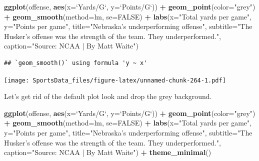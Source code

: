 \documentclass[]{book}
\newenvironment{Shaded}{\begin{snugshade}}{\end{snugshade}}
\newcommand{\DataTypeTok}[1]{\textcolor[rgb]{0.13,0.29,0.53}{#1}}
\newcommand{\KeywordTok}[1]{\textcolor[rgb]{0.13,0.29,0.53}{\textbf{#1}}}
\newcommand{\NormalTok}[1]{#1}
\newcommand{\OperatorTok}[1]{\textcolor[rgb]{0.81,0.36,0.00}{\textbf{#1}}}
\newcommand{\OtherTok}[1]{\textcolor[rgb]{0.56,0.35,0.01}{#1}}
\newcommand{\StringTok}[1]{\textcolor[rgb]{0.31,0.60,0.02}{#1}}
\begin{document}
\begin{Shaded}
\begin{Highlighting}[]
\KeywordTok{ggplot}\NormalTok{(offense, }\KeywordTok{aes}\NormalTok{(}\DataTypeTok{x=}\StringTok{`}\DataTypeTok{Yards/G}\StringTok{`}\NormalTok{, }\DataTypeTok{y=}\StringTok{`}\DataTypeTok{Points/G}\StringTok{`}\NormalTok{)) }\OperatorTok{+}\StringTok{ }
\StringTok{  }\KeywordTok{geom_point}\NormalTok{(}\DataTypeTok{color=}\StringTok{"grey"}\NormalTok{) }\OperatorTok{+}\StringTok{ }\KeywordTok{geom_smooth}\NormalTok{(}\DataTypeTok{method=}\NormalTok{lm, }\DataTypeTok{se=}\OtherTok{FALSE}\NormalTok{) }\OperatorTok{+}\StringTok{ }
\StringTok{  }\KeywordTok{labs}\NormalTok{(}\DataTypeTok{x=}\StringTok{"Total yards per game"}\NormalTok{, }\DataTypeTok{y=}\StringTok{"Points per game"}\NormalTok{, }\DataTypeTok{title=}\StringTok{"Nebraska's underperforming offense"}\NormalTok{, }\DataTypeTok{subtitle=}\StringTok{"The Husker's offense was the strength of the team. They underperformed."}\NormalTok{, }\DataTypeTok{caption=}\StringTok{"Source: NCAA | By Matt Waite"}\NormalTok{)}
\end{Highlighting}
\end{Shaded}

\begin{verbatim}
## `geom_smooth()` using formula 'y ~ x'
\end{verbatim}

\texttt{[image: SportsData\_files/figure-latex/unnamed-chunk-264-1.pdf]}

Let's get rid of the default plot look and drop the grey background.

\begin{Shaded}
\begin{Highlighting}[]
\KeywordTok{ggplot}\NormalTok{(offense, }\KeywordTok{aes}\NormalTok{(}\DataTypeTok{x=}\StringTok{`}\DataTypeTok{Yards/G}\StringTok{`}\NormalTok{, }\DataTypeTok{y=}\StringTok{`}\DataTypeTok{Points/G}\StringTok{`}\NormalTok{)) }\OperatorTok{+}\StringTok{ }
\StringTok{  }\KeywordTok{geom_point}\NormalTok{(}\DataTypeTok{color=}\StringTok{"grey"}\NormalTok{) }\OperatorTok{+}\StringTok{ }\KeywordTok{geom_smooth}\NormalTok{(}\DataTypeTok{method=}\NormalTok{lm, }\DataTypeTok{se=}\OtherTok{FALSE}\NormalTok{) }\OperatorTok{+}\StringTok{ }
\StringTok{  }\KeywordTok{labs}\NormalTok{(}\DataTypeTok{x=}\StringTok{"Total yards per game"}\NormalTok{, }\DataTypeTok{y=}\StringTok{"Points per game"}\NormalTok{, }\DataTypeTok{title=}\StringTok{"Nebraska's underperforming offense"}\NormalTok{, }\DataTypeTok{subtitle=}\StringTok{"The Husker's offense was the strength of the team. They underperformed."}\NormalTok{, }\DataTypeTok{caption=}\StringTok{"Source: NCAA | By Matt Waite"}\NormalTok{) }\OperatorTok{+}\StringTok{ }
\StringTok{  }\KeywordTok{theme_minimal}\NormalTok{()}
\end{Highlighting}
\end{Shaded}
\end{document}
